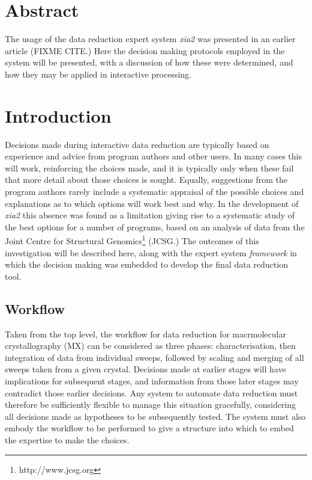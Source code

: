 \documentclass[a4paper,11pt]{article}
\begin{document}
\section{Abstract}

The usage of the data reduction expert system \emph{xia2} was
presented in an earlier article (FIXME CITE.) Here the decision making
protocols employed in the system will be presented, with a discussion
of how these were determined, and how they may be applied in interactive
processing. 

\section{Introduction}

Decisions made during interactive data reduction are typically based
on experience and advice from program authors and other users. In many
cases this will work, reinforcing the choices made, and it is typically
only when these fail that more detail about those choices is
sought. Equally, suggestions from the program authors rarely include a
systematic appraisal of the possible choices and explanations as to
which options will work best and why. 
In the development of \emph{xia2} this absence was found
as a limitation giving rise to a systematic study of the best
options for a number of programs, 
based on an analysis of data from the Joint Centre
for Structural Genomics\footnote{http://www.jcsg.org} (JCSG.) The
outcomes of this investigation will be described here, along with the
expert system \emph{framework} in which the decision making was
embedded to develop the final data reduction tool.

\subsection{Workflow}

Taken from the top level, the workflow for data reduction for
macrmolecular crystallography (MX) can be considered as three phases:
characterisation, then integration of data from individual sweeps,
followed by scaling and merging of all sweeps taken from a given
crystal. Decisions made at earlier stages will have implications for
subsequent stages, and information from those later stages may
contradict those earlier decisions. Any system to automate data
reduction must therefore be sufficiently flexible to manage this
situation gracefully, considering all decisions made as hypotheses to
be subsequently tested. The system must also embody the workflow to be
performed to give a structure into which to embed the expertise to
make the choices. 
\end{document}
